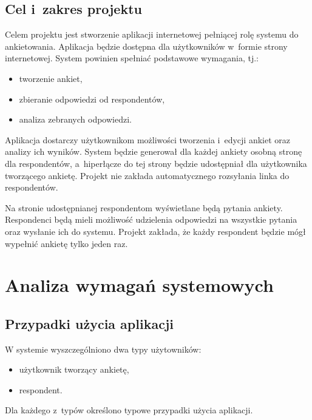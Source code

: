 \documentclass[12pt,a4paper,notitlepage]{article}
\begin{document}
\subsection{Cel i~zakres projektu}
Celem projektu jest stworzenie aplikacji internetowej pełniącej rolę systemu do ankietowania. Aplikacja będzie dostępna dla użytkowników w~formie strony internetowej. System powinien spełniać podstawowe wymagania, tj.:
\begin{itemize}
\item tworzenie ankiet,
\item zbieranie odpowiedzi od respondentów,
\item analiza zebranych odpowiedzi.
\end{itemize}
\par Aplikacja dostarczy użytkownikom możliwości tworzenia i~edycji ankiet oraz analizy ich wyników. System będzie generował dla każdej ankiety osobną stronę dla respondentów, a~hiperłącze do tej strony będzie udostępniał dla użytkownika tworzącego ankietę. Projekt nie zakłada automatycznego rozsyłania linka do respondentów.
\par Na stronie udostępnianej respondentom wyświetlane będą pytania ankiety. Respondenci będą mieli możliwość udzielenia odpowiedzi na wszystkie pytania oraz wysłanie ich do systemu. Projekt zakłada, że każdy respondent będzie mógł wypełnić ankietę tylko jeden raz.

\newpage
\section{Analiza wymagań systemowych}

\subsection{Przypadki użycia aplikacji}
W systemie wyszczególniono dwa typy użytowników: 
\begin{itemize}
\item użytkownik tworzący ankietę,
\item respondent.
\end{itemize}
Dla każdego z~typów określono typowe przypadki użycia aplikacji.
\end{document}

